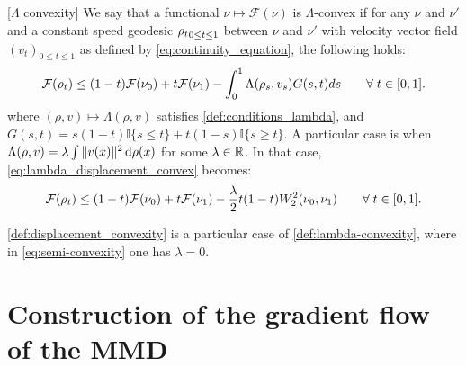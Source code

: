 \begin{definition}\label{def:lambda-convexity}[$\Lambda$ convexity]
	We say that a functional $\nu\mapsto\mathcal{F}(\nu)$ is $\Lambda$-convex
	if for any $\nu$ and $\nu'$ and a constant speed geodesic $\text{\ensuremath{\rho_{t}}}_{0 \le t \le 1}$
	between $\nu$ and $\nu'$ with velocity vector field $(v_{t})_{0 \le t \le 1}$ as defined by \cref{eq:continuity_equation},
	the following holds:
	\begin{equation}\label{eq:lambda_displacement_convex}
		{{\mathcal F}}(\rho_{t})\leq(1-t){{\mathcal F}}(\nu_{0})+t{{\mathcal F}}(\nu_{1})-\int_{0}^{1}\Lambda(\rho_{s},v_{s})G(s,t)ds \qquad\forall\; t\in[0,1].
	\end{equation}
	where $(\rho,v)\mapsto\Lambda(\rho,v)$ satisfies \cref{def:conditions_lambda},
	and $G(s,t)=s(1-t) \mathbb{I}\{s\leq t\}
	+t(1-s) \mathbb{I}\{s\geq t\}$.
	A particular case is when $\Lambda(\rho,v)= \lambda \int \Vert v(x) \Vert^2 \mathop{}\!\mathrm{d} \rho(x)   $ for some $\lambda\in {{\mathbb R}}$. In that case, \cref{eq:lambda_displacement_convex} becomes:
\begin{align}\label{eq:semi-convexity}
	{{\mathcal F}}(\rho_{t})\leq(1-t){{\mathcal F}}(\nu_{0})+t{{\mathcal F}}(\nu_{1})-\frac{\lambda}{2}t(1-t)W_2^2(\nu_0,\nu_1)  \qquad\forall\; t\in[0,1].
\end{align}
\end{definition}
\cref{def:displacement_convexity} is a particular case of \cref{def:lambda-convexity}, where in \cref{eq:semi-convexity} one has $\lambda =0$.

\section{Construction of the gradient flow of the MMD}

